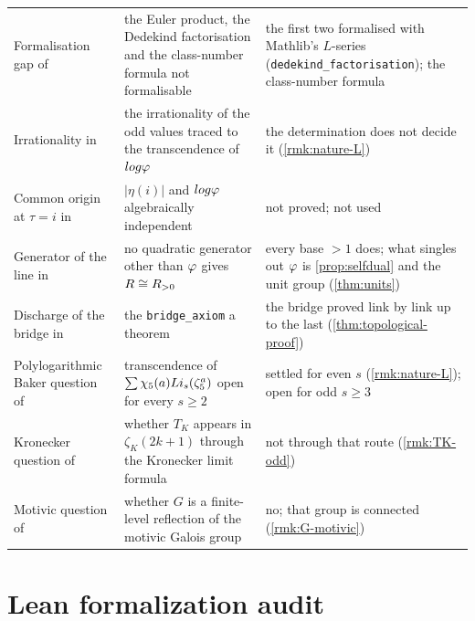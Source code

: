 \begin{longtable}{p{}p{}p{}}
Formalisation gap of \cite{gonzalez26oddzeta} & the Euler product, the Dedekind factorisation and the class-number formula not formalisable & the first two formalised with Mathlib's $L$-series (\texttt{dedekind\_factorisation}); the class-number formula\\
Irrationality in \cite{gonzalez26oddzeta} & the irrationality of the odd values traced to the transcendence of $log\varphi$ & the determination does not decide it (\cref{rmk:nature-L})\\
Common origin at $\tau=i$ in \cite{gonzalez26oddzeta} & $|\eta(i)|$ and $log\varphi$ algebraically independent & not proved; not used\\
Generator of the line in \cite{gonzalez26oddzeta} & no quadratic generator other than $\varphi$ gives $R\cong R_{>0}$ & every base $>1$ does; what singles out $\varphi$ is \cref{prop:selfdual} and the unit group (\cref{thm:units})\\
Discharge of the bridge in \cite{gonzalez26oddzeta} & the \texttt{bridge\_axiom} a theorem & the bridge proved link by link up to the last (\cref{thm:topological-proof})\\
Polylogarithmic Baker question of \cite{gonzalez26oddzeta} & transcendence of $\sum\chi_5(a)Li_s(\zeta_5^a)$ open for every $s\ge2$ & settled for even $s$ (\cref{rmk:nature-L}); open for odd $s\ge3$\\
Kronecker question of \cite{gonzalez26oddzeta} & whether $T_K$ appears in $\zeta_K(2k+1)$ through the Kronecker limit formula & not through that route (\cref{rmk:TK-odd})\\
Motivic question of \cite{gonzalez26oddzeta} & whether $G$ is a finite-level reflection of the motivic Galois group & no; that group is connected (\cref{rmk:G-motivic})\\
\bottomrule\end{longtable}

\section{Lean formalization audit}\label{app:lean}

